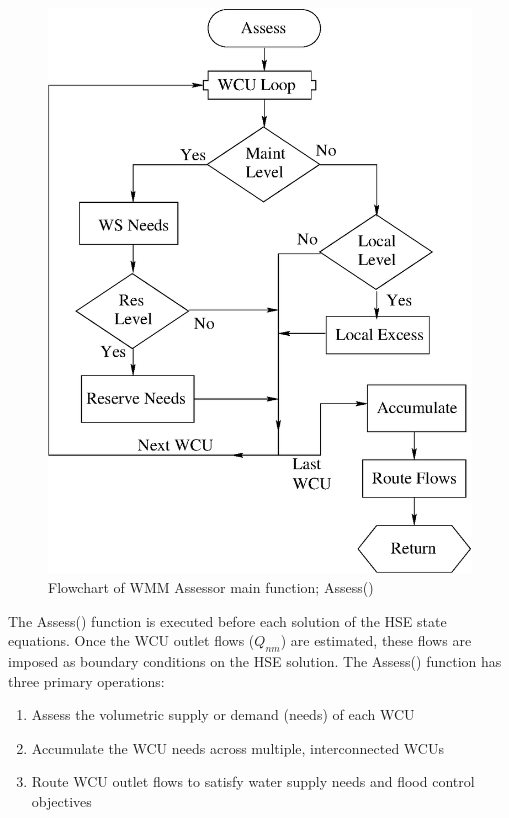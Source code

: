 \begin{figure}
 \begin{center}
  \includegraphics[scale=.33]{Graphics/flowchartWMM.eps}
 \end{center}
 \caption{\label{fig:flowchartWMM} Flowchart of WMM Assessor main
   function; Assess()}
\end{figure}

The Assess() function is executed before each solution of the HSE
state equations. Once the WCU outlet flows ($Q_{nm}$) are estimated,
these flows are imposed as boundary conditions on the HSE
solution. The Assess() function has three primary operations:

\begin{enumerate}
 \item Assess the volumetric supply or demand (needs) of each WCU 
 \item Accumulate the WCU needs across multiple, interconnected WCUs 
 \item Route WCU outlet flows to satisfy water supply needs and flood
   control objectives
\end{enumerate}

